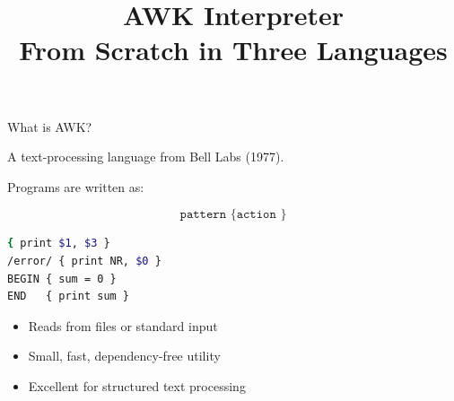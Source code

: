 \documentclass[aspectratio=169]{beamer}
\title{AWK Interpreter \\ From Scratch in Three Languages}
\author{}
\date{}
\begin{document}
\begin{frame}
  \titlepage
\end{frame}

\begin{frame}[fragile]{What is AWK?}

A text-processing language from Bell Labs (1977).

\vspace{0.5em}

Programs are written as:

\[
\texttt{pattern \{ action \}}
\]

\vspace{1em}

\begin{lstlisting}[language=bash]
{ print $1, $3 }
/error/ { print NR, $0 }
BEGIN { sum = 0 }
END   { print sum }
\end{lstlisting}

\vspace{0.5em}

\begin{itemize}
  \item Reads from files or standard input
  \item Small, fast, dependency-free utility
  \item Excellent for structured text processing
\end{itemize}

\end{frame}
\end{document}
